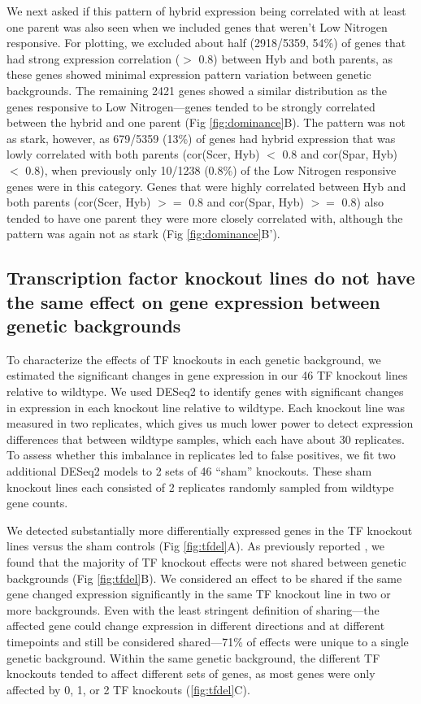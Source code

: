 We next asked if this pattern of hybrid expression being correlated with at least one parent was also seen when we included genes that weren't Low Nitrogen responsive. For plotting, we excluded about half (2918/5359, 54\%) of genes that had strong expression correlation ($>$ 0.8) between Hyb and both parents, as these genes showed minimal expression pattern variation between genetic backgrounds. The remaining 2421 genes showed a similar distribution as the genes responsive to Low Nitrogen---genes tended to be strongly correlated between the hybrid and one parent (Fig \ref{fig:dominance}B). The pattern was not as stark, however, as 679/5359 (13\%) of genes had hybrid expression that was lowly correlated with both parents (cor(Scer, Hyb) $<$ 0.8 and cor(Spar, Hyb) $<$ 0.8), when previously only 10/1238 (0.8\%) of the Low Nitrogen responsive genes were in this category. Genes that were highly correlated between Hyb and both parents (cor(Scer, Hyb) $>=$ 0.8 and cor(Spar, Hyb) $>=$ 0.8) also tended to have one parent they were more closely correlated with, although the pattern was again not as stark (Fig \ref{fig:dominance}B').

\subsection{Transcription factor knockout lines do not have the same effect on gene expression between genetic backgrounds}

To characterize the effects of TF knockouts in each genetic background, we estimated the significant changes in gene expression in our 46 TF knockout lines relative to wildtype. We used DESeq2 \cite{Love2014} to identify genes with significant changes in expression in each knockout line relative to wildtype. Each knockout line was measured in two replicates, which gives us much lower power to detect expression differences that between wildtype samples, which each have about 30 replicates. To assess whether this imbalance in replicates led to false positives, we fit two additional DESeq2 models to 2 sets of 46 ``sham'' knockouts. These sham knockout lines each consisted of 2 replicates randomly sampled from wildtype gene counts.

We detected substantially more differentially expressed genes in the TF knockout lines versus the sham controls (Fig \ref{fig:tfdel}A). As previously reported \cite{Liu2024, Li2025}, we found that the majority of TF knockout effects were not shared between genetic backgrounds (Fig \ref{fig:tfdel}B). We considered an effect to be shared if the same gene changed expression significantly in the same TF knockout line in two or more backgrounds. Even with the least stringent definition of sharing---the affected gene could change expression in different directions and at different timepoints and still be considered shared---71\% of effects were unique to a single genetic background. Within the same genetic background, the different TF knockouts tended to affect different sets of genes, as most genes were only affected by 0, 1, or 2 TF knockouts (\ref{fig:tfdel}C).

